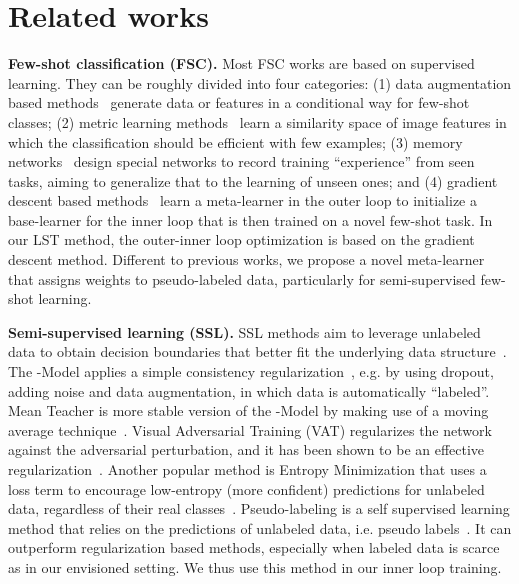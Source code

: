 \documentclass{article}
\newcommand{\myparagraph}[1]{\vspace{0.1em}\noindent\textbf{#1}}
\begin{document}
\section{Related works}
\myparagraph{Few-shot classification (FSC).}
Most FSC works are based on supervised learning. They can be roughly divided into four categories:
(1) data augmentation based methods~\cite{Mehrotra2017, SchwartzNIPS18, WangCVPR2018, XianCVPR2019a} generate data or features in a conditional way for few-shot classes;
(2) metric learning methods~\cite{VinyalsBLKW16, SnellSZ17, SungCVPR2018} learn a similarity space of image features in which the classification should be efficient with few examples;
(3) memory networks~\cite{MunkhdalaiICML2017, SantoroBBWL16, OreshkinNIPS18, MishraICLR2018} design special networks to record training ``experience'' from seen tasks, aiming to generalize that to the learning of unseen ones; 
and 
(4) gradient descent based methods~\cite{FinnAL17, FinnNIPS2018, AntoniouICLR19, RaviICLR2017, LeeICML18, GrantICLR2018, ZhangNIPS2018MetaGAN, SunCVPR2019}
learn a meta-learner in the outer loop to initialize a base-learner for the inner loop that is then trained on a novel few-shot task.
In our LST method, the outer-inner loop optimization is based on the gradient descent method. Different to previous works, we propose a novel meta-learner that assigns weights to pseudo-labeled data, particularly for semi-supervised few-shot learning.


\myparagraph{Semi-supervised learning (SSL).} 
SSL methods aim to leverage unlabeled data to obtain decision boundaries that better fit the underlying data structure~\cite{OliverNIPS18semi_survey}.
The -Model applies a simple consistency regularization~\cite{LaineICLR2017pi_model}, e.g. by using dropout, adding noise and data augmentation, in which data is automatically ``labeled''.
Mean Teacher is more stable version of the -Model by making use of a moving average technique~\cite{TarvainenNIPS17mean_teacher}.
Visual Adversarial Training (VAT) regularizes the network against the adversarial perturbation, and it has been shown to be an effective regularization~\cite{MiyatoDG16VAT}. 
Another popular method is Entropy Minimization that uses a loss term to encourage low-entropy (more confident) predictions for unlabeled data, regardless of their real classes~\cite{GrandvaletNIPS04_entmin}.
Pseudo-labeling is a self supervised learning method that relies on the predictions of unlabeled data, i.e. pseudo labels~\cite{Lee2013pseudo_label}.
It can outperform regularization based methods, especially when labeled data is scarce~\cite{OliverNIPS18semi_survey} as in our envisioned setting.
We thus use this method in our inner loop training.
\end{document}

